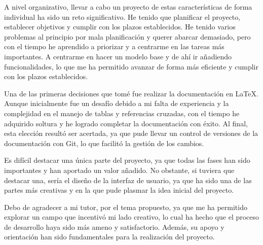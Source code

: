 A nivel organizativo, llevar a cabo un proyecto de estas características de forma individual ha sido un reto significativo. He tenido que planificar el proyecto, 
establecer objetivos y cumplir con los plazos establecidos. 
He tenido varios problemas al principio por mala planificación y querer abarcar demasiado, pero con el tiempo he aprendido a priorizar y a centrarme en las tareas más importantes.
A centrarme en hacer un modelo base y de ahí ir añadiendo funcionalidades, lo que me ha permitido avanzar de forma más eficiente y cumplir con los plazos establecidos.


Una de las primeras decisiones que tomé fue realizar la documentación en LaTeX. Aunque inicialmente fue un desafío debido a mi falta de experiencia y la complejidad en el manejo de tablas 
y referencias cruzadas, con el tiempo he adquirido soltura y he logrado completar la documentación con éxito. Al final, esta elección resultó ser acertada, ya que pude llevar un control de 
versiones de la documentación con Git, lo que facilitó la gestión de los cambios.

Es difícil destacar una única parte del proyecto, ya que todas las fases han sido importantes y han aportado un valor añadido. No obstante, si tuviera que destacar una, 
sería el diseño de la interfaz de usuario, ya que ha sido una de las partes más creativas y en la que pude plasmar la idea inicial del proyecto. 

Debo de agradecer a mi tutor, por el tema propuesto, ya que me ha permitido explorar un campo que incentivó mi lado creativo, 
lo cual ha hecho que el proceso de desarrollo haya sido más ameno y satisfactorio. Además, su apoyo y orientación han sido fundamentales para la realización del proyecto.

